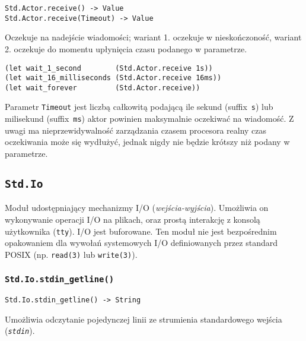 \begin{small}
\begin{lstlisting}
Std.Actor.receive() -> Value
Std.Actor.receive(Timeout) -> Value
\end{lstlisting}
\end{small}

Oczekuje na nadejście wiadomości; wariant 1. oczekuje w nieskończoność,
wariant 2. oczekuje do momentu upłynięcia czasu podanego w parametrze.

\begin{small}
\begin{lstlisting}
(let wait_1_second        (Std.Actor.receive 1s))
(let wait_16_milliseconds (Std.Actor.receive 16ms))
(let wait_forever         (Std.Actor.receive))
\end{lstlisting}
\end{small}

Parametr \texttt{Timeout} jest liczbą całkowitą podającą ile sekund
(suffix~\texttt{s}) lub milisekund (suffix~\texttt{ms}) aktor powinien
maksymalnie oczekiwać na wiadomość. Z uwagi ma nieprzewidywalność zarządzania
czasem procesora realny czas oczekiwania może się wydłużyć, jednak nigdy nie
będzie krótszy niż podany w parametrze.

\subsection{\texttt{Std.Io}}
\label{stdlib_Std_Io}

Moduł udostępniający mechanizmy I/O (\emph{wejścia-wyjścia}).
Umożliwia on wykonywanie operacji I/O na plikach, oraz prostą interakcję z
konsolą użytkownika (\texttt{tty}). I/O jest buforowane. Ten moduł nie jest
bezpośrednim opakowaniem dla wywołań systemowych I/O definiowanych przez
standard POSIX (np. \texttt{read(3)} lub \texttt{write(3)}).

\subsubsection{\texttt{Std.Io.stdin\_getline()}}

\begin{small}
\begin{lstlisting}
Std.Io.stdin_getline() -> String
\end{lstlisting}
\end{small}

Umożliwia odczytanie pojedynczej linii ze strumienia standardowego wejścia (\emph{\texttt{stdin}}).

